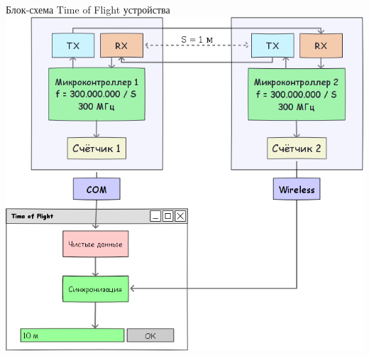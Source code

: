 \begin{frame}{Блок-схема Time of Flight устройства}
    \centering
    \includegraphics[width=.6\linewidth]{../Figures/commonscheme.png}
\end{frame}

